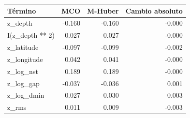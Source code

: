 \begin{tabular}{lrrr}
\toprule
Término & MCO & M-Huber & Cambio absoluto \\
\midrule
z\_depth & -0.160 & -0.160 & -0.000 \\
I(z\_depth ** 2) & 0.027 & 0.027 & -0.000 \\
z\_latitude & -0.097 & -0.099 & -0.002 \\
z\_longitude & 0.042 & 0.041 & -0.000 \\
z\_log\_nst & 0.189 & 0.189 & -0.000 \\
z\_log\_gap & -0.037 & -0.036 & 0.001 \\
z\_log\_dmin & 0.027 & 0.030 & 0.003 \\
z\_rms & 0.011 & 0.009 & -0.003 \\
\bottomrule
\end{tabular}
